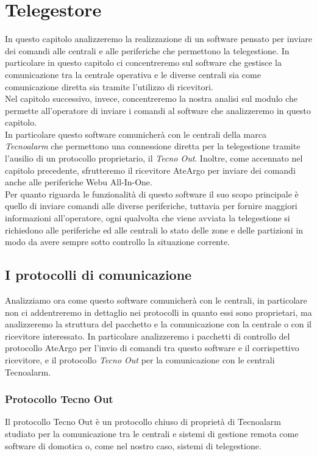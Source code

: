 \chapter{Telegestore}
\label{capitolo5}
\thispagestyle{empty}
In questo capitolo analizzeremo la realizzazione di un software pensato per inviare dei comandi alle centrali e alle periferiche che permettono la telegestione. In particolare in questo capitolo ci concentreremo sul software che gestisce  la comunicazione tra la centrale operativa e le diverse centrali sia come comunicazione diretta sia tramite l'utilizzo di ricevitori.\\
Nel capitolo successivo, invece, concentreremo la nostra analisi sul modulo che permette all'operatore di inviare i comandi al software che analizzeremo in questo capitolo.\\
In particolare questo software comunicherà con le centrali della marca \emph{Tecnoalarm} che permettono una connessione diretta per la telegestione tramite l'ausilio di un protocollo proprietario, il \emph{Tecno Out}. Inoltre, come accennato nel capitolo precedente, sfrutteremo il ricevitore AteArgo per inviare dei comandi anche alle periferiche Webu All-In-One.\\
Per quanto riguarda le funzionalità di questo software il suo scopo principale è quello di inviare comandi alle diverse periferiche, tuttavia per fornire maggiori informazioni all'operatore, ogni qualvolta che viene avviata la telegestione si richiedono alle periferiche ed alle centrali lo stato delle zone e delle partizioni in modo da avere sempre sotto controllo la situazione corrente.\\
\section{I protocolli di comunicazione}
Analizziamo ora come questo software comunicherà con le centrali, in particolare non ci addentreremo in dettaglio nei protocolli in quanto essi sono proprietari, ma analizzeremo la struttura del pacchetto e la comunicazione con la centrale o con il ricevitore interessato. In particolare analizzeremo i pacchetti di controllo del protocollo AteArgo per l'invio di comandi tra questo software e il corrispettivo ricevitore, e il protocollo \emph{Tecno Out} per la comunicazione con le centrali Tecnoalarm.
\subsection{Protocollo Tecno Out}
Il protocollo Tecno Out è un protocollo chiuso di proprietà di Tecnoalarm studiato per la comunicazione tra le centrali e sistemi di gestione remota come software di domotica o, come nel nostro caso, sistemi di telegestione.
